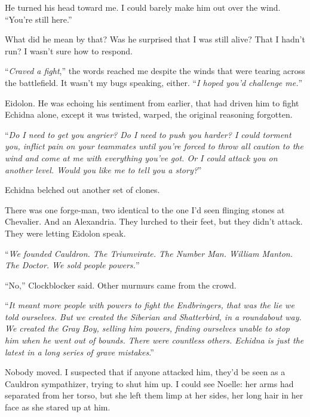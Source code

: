 He turned his head toward me.  I could barely make him out over the wind.  ``You're still here.''



What did he mean by that?  Was he surprised that I was still alive?  That I hadn't run?  I wasn't sure how to respond.



``\emph{Craved a fight},'' the words reached me despite the winds that were tearing across the battlefield.  It wasn't my bugs speaking, either.  ``\emph{I hoped you'd challenge me.}''



Eidolon.  He was echoing his sentiment from earlier, that had driven him to fight Echidna alone, except it was twisted, warped, the original reasoning forgotten.



``\emph{Do I need to get you angrier?  Do I need to push you harder?  I could torment you, inflict pain on your teammates until you're forced to throw all caution to the wind and come at me with everything you've got.  Or I could attack you on another level.  Would you like me to tell you a story?}''



Echidna belched out another set of clones.



There was one forge-man, two identical to the one I'd seen flinging stones at Chevalier.  And an Alexandria.  They lurched to their feet, but they didn't attack.  They were letting Eidolon speak.



``\emph{We founded Cauldron.  The Triumvirate.  The Number Man.  William Manton.  The Doctor.  We sold people powers.}''



``No,'' Clockblocker said.  Other murmurs came from the crowd.



``\emph{It meant more people with powers to fight the Endbringers, that was the lie we told ourselves.  But we created the Siberian and Shatterbird, in a roundabout way.  We created the Gray Boy, selling him powers, finding ourselves unable to stop him when he went out of bounds.  There were countless others.  Echidna is just the latest in a long series of grave mistakes}.''



Nobody moved.  I suspected that if anyone attacked him, they'd be seen as a Cauldron sympathizer, trying to shut him up.  I could see Noelle: her arms had separated from her torso, but she left them limp at her sides, her long hair in her face as she stared up at him.



